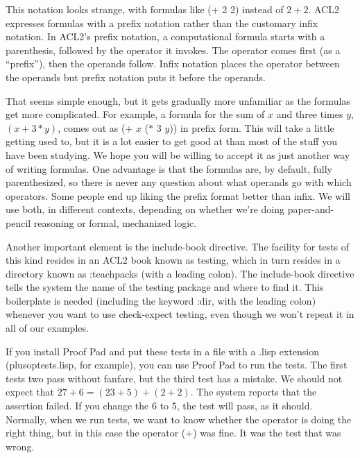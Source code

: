 This notation looks strange, with formulas like \textsf{(+ 2 2)} instead of $2 + 2$.
ACL2 expresses formulas with a
prefix notation
rather than the customary infix notation.
In ACL2's prefix notation, a computational
formula starts with a parenthesis,
followed by the operator it invokes.
The operator comes first (as a ``prefix''), then the operands follow.
Infix notation places the operator between the operands
but prefix notation puts it before the operands.

That seems simple enough, but it gets gradually more unfamiliar
as the formulas get more complicated.
For example, a formula for the sum of $x$ and three times $y$, $(x + 3*y)$,
comes out as \textsf{(+ $x$ ($*$ 3 $y$))} in prefix form.
This will take a little getting used to,
but it is a lot easier to get good at than
most of the stuff you have been studying.
We hope you will be willing to accept it as just another way of writing formulas.
One advantage is that the formulas are, by default, fully parenthesized,
so there is never any question about what operands go with which operators.
Some people end up liking the prefix format better than infix.
We will use both, in different contexts, depending on whether
we're doing paper-and-pencil reasoning or formal, mechanized logic.

Another important element is the
\textsf{include-book}
directive.
The facility for tests of this kind resides in an ACL2 book
known as \textsf{testing}, which in turn resides in a directory known
as
\textsf{:teachpacks} (with a leading colon).
The \textsf{include-book} directive tells the system
the name of the testing package and where to find it.
This boilerplate is needed (including the keyword \textsf{:dir}, with the leading colon)
whenever you want to use \textsf{check-expect} testing,
even though we won't repeat it in all of our examples. %

If you install Proof Pad and put these tests in a file
with a .lisp extension (plusoptests.lisp, for example),
you can use Proof Pad to run the tests.
The first tests two pass without fanfare,
but the third test has a mistake.
We should not expect that $27 + 6 = (23 + 5) + (2 + 2)$.
The system reports that the assertion failed.
If you change the 6 to 5, the test will pass, as it should.
Normally, when we run tests, we want to know whether the
operator is doing the right thing,
but in this case the operator (\textsf{+}) was fine.
It was the test that was wrong.

